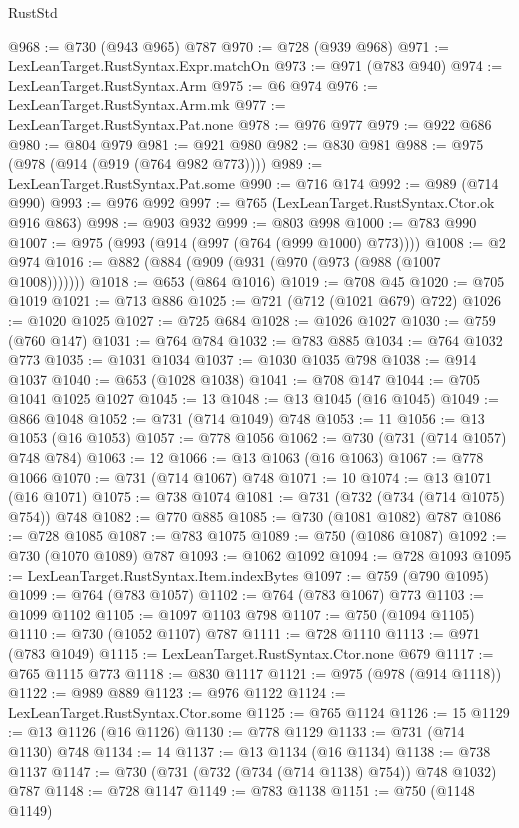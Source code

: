 \begin{lexlean}{RustStd}
\begin{coremodule}
@968 := @730 (@943 @965) @787
@970 := @728 (@939 @968)
@971 := LexLeanTarget.RustSyntax.Expr.matchOn
@973 := @971 (@783 @940)
@974 := LexLeanTarget.RustSyntax.Arm
@975 := @6 @974
@976 := LexLeanTarget.RustSyntax.Arm.mk
@977 := LexLeanTarget.RustSyntax.Pat.none
@978 := @976 @977
@979 := @922 @686
@980 := @804 @979
@981 := @921 @980
@982 := @830 @981
@988 := @975 (@978 (@914 (@919 (@764 @982 @773))))
@989 := LexLeanTarget.RustSyntax.Pat.some
@990 := @716 @174
@992 := @989 (@714 @990)
@993 := @976 @992
@997 := @765 (LexLeanTarget.RustSyntax.Ctor.ok @916 @863)
@998 := @903 @932
@999 := @803 @998
@1000 := @783 @990
@1007 := @975 (@993 (@914 (@997 (@764 (@999 @1000) @773))))
@1008 := @2 @974
@1016 := @882 (@884 (@909 (@931 (@970 (@973 (@988 (@1007 @1008)))))))
@1018 := @653 (@864 @1016)
@1019 := @708 @45
@1020 := @705 @1019
@1021 := @713 @886
@1025 := @721 (@712 (@1021 @679) @722)
@1026 := @1020 @1025
@1027 := @725 @684
@1028 := @1026 @1027
@1030 := @759 (@760 @147)
@1031 := @764 @784
@1032 := @783 @885
@1034 := @764 @1032 @773
@1035 := @1031 @1034
@1037 := @1030 @1035 @798
@1038 := @914 @1037
@1040 := @653 (@1028 @1038)
@1041 := @708 @147
@1044 := @705 @1041 @1025 @1027
@1045 := 13
@1048 := @13 @1045 (@16 @1045)
@1049 := @866 @1048
@1052 := @731 (@714 @1049) @748
@1053 := 11
@1056 := @13 @1053 (@16 @1053)
@1057 := @778 @1056
@1062 := @730 (@731 (@714 @1057) @748 @784)
@1063 := 12
@1066 := @13 @1063 (@16 @1063)
@1067 := @778 @1066
@1070 := @731 (@714 @1067) @748
@1071 := 10
@1074 := @13 @1071 (@16 @1071)
@1075 := @738 @1074
@1081 := @731 (@732 (@734 (@714 @1075) @754)) @748
@1082 := @770 @885
@1085 := @730 (@1081 @1082) @787
@1086 := @728 @1085
@1087 := @783 @1075
@1089 := @750 (@1086 @1087)
@1092 := @730 (@1070 @1089) @787
@1093 := @1062 @1092
@1094 := @728 @1093
@1095 := LexLeanTarget.RustSyntax.Item.indexBytes
@1097 := @759 (@790 @1095)
@1099 := @764 (@783 @1057)
@1102 := @764 (@783 @1067) @773
@1103 := @1099 @1102
@1105 := @1097 @1103 @798
@1107 := @750 (@1094 @1105)
@1110 := @730 (@1052 @1107) @787
@1111 := @728 @1110
@1113 := @971 (@783 @1049)
@1115 := LexLeanTarget.RustSyntax.Ctor.none @679
@1117 := @765 @1115 @773
@1118 := @830 @1117
@1121 := @975 (@978 (@914 @1118))
@1122 := @989 @889
@1123 := @976 @1122
@1124 := LexLeanTarget.RustSyntax.Ctor.some
@1125 := @765 @1124
@1126 := 15
@1129 := @13 @1126 (@16 @1126)
@1130 := @778 @1129
@1133 := @731 (@714 @1130) @748
@1134 := 14
@1137 := @13 @1134 (@16 @1134)
@1138 := @738 @1137
@1147 := @730 (@731 (@732 (@734 (@714 @1138) @754)) @748 @1032) @787
@1148 := @728 @1147
@1149 := @783 @1138
@1151 := @750 (@1148 @1149)

\end{coremodule}
\end{lexlean}
